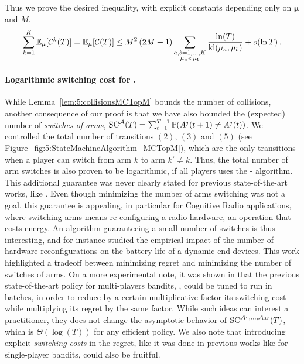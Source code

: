 \begin{smallproof}
  Thus we prove the desired inequality, with explicit constants depending only on $\boldsymbol{\mu}$ and $M$.
  \begin{equation}
    \sum_{k=1}^K \mathbb{E}_{\mu}[\mathcal{C}^k(T)] = \mathbb{E}_{\mu}[\mathcal{C}(T)]
    \leq M^2\left(2 M + 1\right) \sum_{\substack{a,b=1,\dots,K\\\mu_a < \mu_b}} \frac{\ln(T)}{\mathrm{kl}(\mu_a,\mu_b)} + \mathop{}\mathopen{}o\mathopen{}\left(\ln T\right).
  \end{equation}
\end{smallproof}


\paragraph{Logarithmic switching cost for \MCTopM.}\label{app:5:NumberSwitches}
%
While Lemma~\ref{lem:5:collisionsMCTopM} bounds the number of collisions,
another consequence of our proof is that we have also bounded
the (expected) number of \emph{switches of arms}, $\mathrm{SC}^{\mathcal{A}}(T) = \sum_{t=1}^{T-1} \mathbb{P}(A^j(t+1) \neq A^j(t))$.
%
We controlled the total number of transitions $(2)$, $(3)$ and $(5)$ (see Figure~\ref{fig:5:StateMachineAlgorithm_MCTopM}),
which are the only transitions when a player can switch from arm $k$ to arm $k'\neq k$.
Thus, the total number of arm switches is also proven to be logarithmic, if all players uses the \MCTopM-\klUCB{} algorithm.
This additional guarantee was never clearly stated for previous state-of-the-art works, like \rhoRand.
%
Even though minimizing the number of arms switching was not a goal,
this guarantee is appealing, in particular for Cognitive Radio applications,
where switching arms means re-configuring a radio hardware, an operation that costs energy.
An algorithm guaranteeing a small number of switches is thus interesting,
and for instance \cite{modiDemo2016} studied the empirical impact of the number of hardware reconfigurations on the battery life of a dynamic end-devices.
This work highlighted a tradeoff between minimizing regret and minimizing the number of switches of arms.
On a more experimental note, it was shown in \cite{modiDemo2016} that the previous state-of-the-art policy for multi-players bandits, \rhoRand, could be tuned to run in batches, in order to reduce by a certain multiplicative factor its switching cost while multiplying its regret by the same factor.
While such ideas can interest a practitioner, they does not change the asymptotic behavior of $\mathrm{SC}^{\mathcal{A}_1,\dots,\mathcal{A}_M}(T)$, which is $\Theta(\log(T))$ for any efficient policy.
%
We also note that introducing explicit \emph{switching costs} in the regret, like it was done in previous works like \cite{Koren17} for single-player bandits, could also be fruitful.

